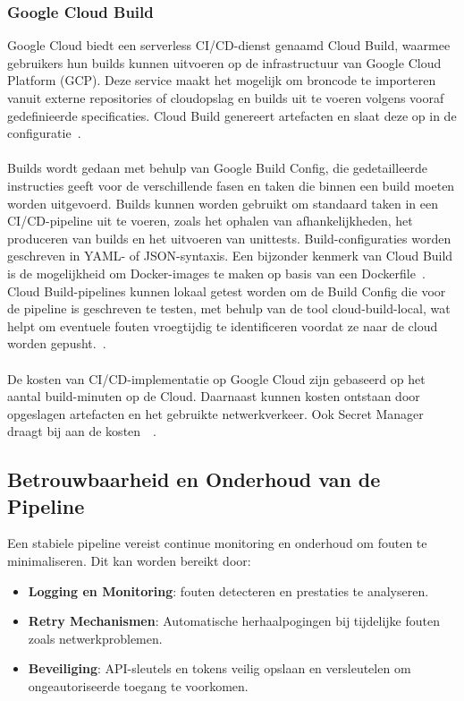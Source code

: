 \subsubsection{Google Cloud Build}

Google Cloud biedt een serverless CI/CD-dienst genaamd Cloud Build, waarmee gebruikers hun builds kunnen uitvoeren op de infrastructuur van Google Cloud Platform (GCP). Deze service maakt het mogelijk om broncode te importeren vanuit externe repositories of cloudopslag en builds uit te voeren volgens vooraf gedefinieerde specificaties. Cloud Build genereert artefacten en slaat deze op in de configuratie~\autocite{googleCloudBuildOverview}.
\\\\
Builds wordt gedaan met behulp van Google Build Config, die gedetailleerde instructies geeft voor de verschillende fasen en taken die binnen een build moeten worden uitgevoerd. Builds kunnen worden gebruikt om standaard taken in een CI/CD-pipeline uit te voeren, zoals het ophalen van afhankelijkheden, het produceren van builds en het uitvoeren van unittests. Build-configuraties worden geschreven in YAML- of JSON-syntaxis. Een bijzonder kenmerk van Cloud Build is de mogelijkheid om Docker-images te maken op basis van een Dockerfile~\autocite{googleQuickstartBuild}. Cloud Build-pipelines kunnen lokaal getest worden om de Build Config die voor de pipeline is geschreven te testen, met behulp van de tool cloud-build-local, wat helpt om eventuele fouten vroegtijdig te identificeren voordat ze naar de cloud worden gepusht.~\autocite{googleCloudBuildOverview}.
\\\\
De kosten van CI/CD-implementatie op Google Cloud zijn gebaseerd op het aantal build-minuten op de Cloud. Daarnaast kunnen kosten ontstaan door opgeslagen artefacten en het gebruikte netwerkverkeer. Ook Secret Manager draagt bij aan de kosten~\autocite{googleCloudBuildPricing}~\autocite{googleSecretManagerPricing}.

\subsection{Betrouwbaarheid en Onderhoud van de Pipeline}
Een stabiele pipeline vereist continue monitoring en onderhoud om fouten te minimaliseren. Dit kan worden bereikt door:

\begin{itemize}
    \item \textbf{Logging en Monitoring}: fouten detecteren en prestaties te analyseren.
    \item \textbf{Retry Mechanismen}: Automatische herhaalpogingen bij tijdelijke fouten zoals netwerkproblemen.
    \item \textbf{Beveiliging}: API-sleutels en tokens veilig opslaan en versleutelen om ongeautoriseerde toegang te voorkomen.
\end{itemize}

